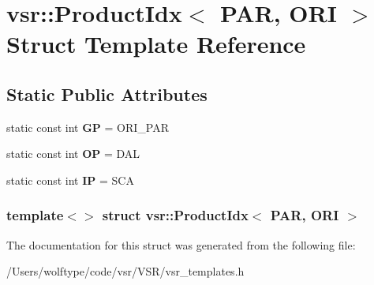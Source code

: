 \hypertarget{structvsr_1_1_product_idx_3_01_p_a_r_00_01_o_r_i_01_4}{\section{vsr\-:\-:Product\-Idx$<$ P\-A\-R, O\-R\-I $>$ Struct Template Reference}
\label{structvsr_1_1_product_idx_3_01_p_a_r_00_01_o_r_i_01_4}
}
\subsection*{Static Public Attributes}
\begin{DoxyCompactItemize}
\item 
\hypertarget{structvsr_1_1_product_idx_3_01_p_a_r_00_01_o_r_i_01_4_a1141b3bb5b7ec15244a73e3b3be1656b}{static const int {\bfseries G\-P} = O\-R\-I\-\_\-\-P\-A\-R}\label{structvsr_1_1_product_idx_3_01_p_a_r_00_01_o_r_i_01_4_a1141b3bb5b7ec15244a73e3b3be1656b}

\item 
\hypertarget{structvsr_1_1_product_idx_3_01_p_a_r_00_01_o_r_i_01_4_afae6ccc11fb9271e9e63738c4663e727}{static const int {\bfseries O\-P} = D\-A\-L}\label{structvsr_1_1_product_idx_3_01_p_a_r_00_01_o_r_i_01_4_afae6ccc11fb9271e9e63738c4663e727}

\item 
\hypertarget{structvsr_1_1_product_idx_3_01_p_a_r_00_01_o_r_i_01_4_aeabb1371b60daf97b98dcb955d716dae}{static const int {\bfseries I\-P} = S\-C\-A}\label{structvsr_1_1_product_idx_3_01_p_a_r_00_01_o_r_i_01_4_aeabb1371b60daf97b98dcb955d716dae}

\end{DoxyCompactItemize}
\subsubsection*{template$<$$>$ struct vsr\-::\-Product\-Idx$<$ P\-A\-R, O\-R\-I $>$}



The documentation for this struct was generated from the following file\-:\begin{DoxyCompactItemize}
\item 
/\-Users/wolftype/code/vsr/\-V\-S\-R/vsr\-\_\-templates.\-h\end{DoxyCompactItemize}
